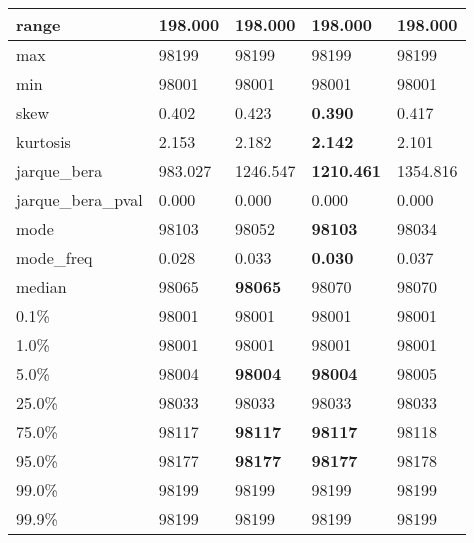\begin{table}[H]
\begin{tabular}{|l|m{10em}|m{10em}|m{10em}|m{10em}|}
\hline range & 198.000 & 198.000 & 198.000 & 198.000 \\
\hline max & 98199 & 98199 & 98199 & 98199 \\
\hline min & 98001 & 98001 & 98001 & 98001 \\
\hline skew & 0.402 & \cellcolor[rgb]{0.9, 0.54, 0.52} 0.423 & \bfseries 0.390 & 0.417 \\
\hline kurtosis & 2.153 & 2.182 & \bfseries 2.142 & \cellcolor[rgb]{0.9, 0.54, 0.52} 2.101 \\
\hline jarque\_bera & 983.027 & 1246.547 & \bfseries 1210.461 & \cellcolor[rgb]{0.9, 0.54, 0.52} 1354.816 \\
\hline jarque\_bera\_pval & 0.000 & 0.000 & 0.000 & 0.000 \\
\hline mode & 98103 & 98052 & \bfseries 98103 & \cellcolor[rgb]{0.9, 0.54, 0.52} 98034 \\
\hline mode\_freq & 0.028 & 0.033 & \bfseries 0.030 & \cellcolor[rgb]{0.9, 0.54, 0.52} 0.037 \\
\hline median & 98065 & \bfseries 98065 & \cellcolor[rgb]{0.9, 0.54, 0.52} 98070 & \cellcolor[rgb]{0.9, 0.54, 0.52} 98070 \\
\hline 0.1\% & 98001 & 98001 & 98001 & 98001 \\
\hline 1.0\% & 98001 & 98001 & 98001 & 98001 \\
\hline 5.0\% & 98004 & \bfseries 98004 & \bfseries 98004 & \cellcolor[rgb]{0.9, 0.54, 0.52} 98005 \\
\hline 25.0\% & 98033 & 98033 & 98033 & 98033 \\
\hline 75.0\% & 98117 & \bfseries 98117 & \bfseries 98117 & \cellcolor[rgb]{0.9, 0.54, 0.52} 98118 \\
\hline 95.0\% & 98177 & \bfseries 98177 & \bfseries 98177 & \cellcolor[rgb]{0.9, 0.54, 0.52} 98178 \\
\hline 99.0\% & 98199 & 98199 & 98199 & 98199 \\
\hline 99.9\% & 98199 & 98199 & 98199 & 98199 \\
\hline
\end{tabular}
\end{table}
